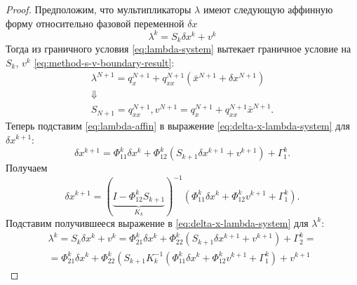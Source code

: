 \documentclass[../../doc.tex]{subfiles}
\begin{document}
    \begin{proof}
        Предположим, что мультипликаторы $\lambda$ имеют следующую аффинную форму относительно фазовой переменной $\delta x$
        \begin{equation}\label{eq:lambda-affin}
            \lambda^{k} = S_k \delta x^k + v^k
        \end{equation}
        Тогда из граничного условия \eqref{eq:lambda-system} вытекает граничное условие на $S_k$, $v^k$ \eqref{eq:method-s-v-boundary-result}:
        \begin{equation*}
            \begin{gathered}
                \lambda^{N+1} = q_x^{N+1} + q_{xx}^{N+1}\left(\bar x^{N+1} + \delta x^{N+1}\right)
                \\ \Downarrow \\
                S_{N+1} = q^{N+1}_{xx}, v^{N+1} = q^{N+1}_{x} + q^{N+1}_{xx}\bar x^{N+1}.
            \end{gathered}
        \end{equation*}
        Теперь подставим \eqref{eq:lambda-affin} в выражение \eqref{eq:delta-x-lambda-system} для $\delta x^{k+1}$:
        \begin{equation*}
            \delta x^{k+1} = \Phi^k_{11} \delta x^k + \Phi^k_{12} (S_{k+1}\delta x^{k+1} + v^{k+1}) + \Gamma^k_{1}.
        \end{equation*}
        Получаем
        \begin{equation*}
                \delta x^{k+1}
            =
                \left(
                    \underbrace{
                        I - \Phi^k_{12} S_{k+1}
                    }_{K_k}
                \right)^{-1}
                \!\!\!\!\!\left(
                    \Phi^k_{11} \delta x^k + \Phi^k_{12} v^{k+1} + \Gamma^k_{1}
                \right).
        \end{equation*}
        Подставим получившееся выражение в \eqref{eq:delta-x-lambda-system} для $\lambda^k$:
        \begin{multline*}
                \lambda^{k} = S_k \delta x^k + v^k
            =
                \Phi^k_{21} \delta x^k + \Phi^k_{22} \left( S_{k+1} \delta x^{k+1} + v^{k+1} \right) + \Gamma^k_{2}
            =\\=
                    \Phi^k_{21} \delta x^k
                +
                    \Phi^k_{22}
                    \left(
                            S_{k+1} K_k^{-1} (\Phi^k_{11} \delta x^k + \Phi^k_{12} v^{k+1} + \Gamma^k_{1})
                        +
                            v^{k+1} 

\end{multline*}
\end{proof}
\end{document}
